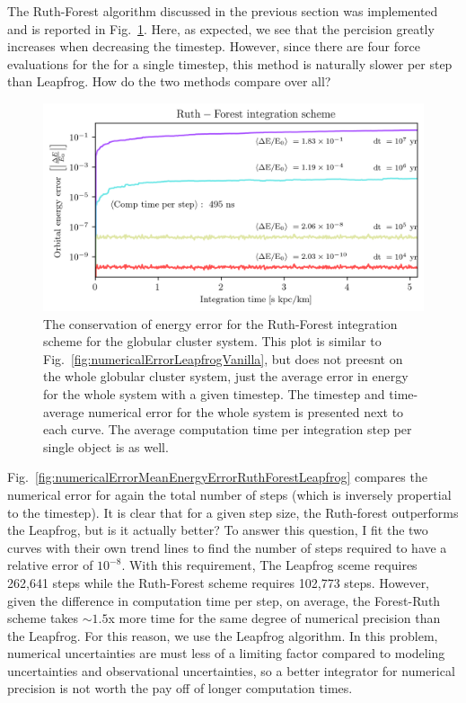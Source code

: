         The Ruth-Forest algorithm discussed in the previous section was implemented and is reported in Fig.~\ref{fig:numericalErrorRuthForest}. Here, as expected, we see that the percision greatly increases when decreasing the timestep. However, since there are four force evaluations for the for a single timestep, this method is naturally slower per step than Leapfrog. How do the two methods compare over all?
        \begin{figure}
            \centering
            \includegraphics[width=\linewidth]{images/numericalErrorRuthForest.png}
            \caption[Relative orbital energy using the Ruth-Forest scheme]{The conservation of energy error for the Ruth-Forest integration scheme for the globular cluster system. This plot is similar to Fig.~\ref{fig:numericalErrorLeapfrogVanilla}, but does not preesnt on the whole globular cluster system, just the average error in energy for the whole system with a given timestep. The timestep and time-average numerical error for the whole system is presented next to each curve. The average computation time per integration step per single object is as well.}
            \label{fig:numericalErrorRuthForest}
        \end{figure}
        Fig.~\ref{fig:numericalErrorMeanEnergyErrorRuthForestLeapfrog} compares the numerical error for again the total number of steps (which is inversely propertial to the timestep). It is clear that for a given step size, the Ruth-forest outperforms the Leapfrog, but is it actually better? To answer this question, I fit the two curves with their own trend lines to find the number of steps required to have a relative error of $10^{-8}$. With this requirement, The Leapfrog sceme requires 262,641 steps while the Ruth-Forest scheme requires 102,773 steps. However, given the difference in computation time per step, on average, the Forest-Ruth scheme takes $\sim 1.5$x more time for the same degree of numerical precision than the Leapfrog. For this reason, we use the Leapfrog algorithm. In this problem, numerical uncertainties are must less of a limiting factor compared to modeling uncertainties and observational uncertainties, so a better integrator for numerical precision is not worth the pay off of longer computation times. 
